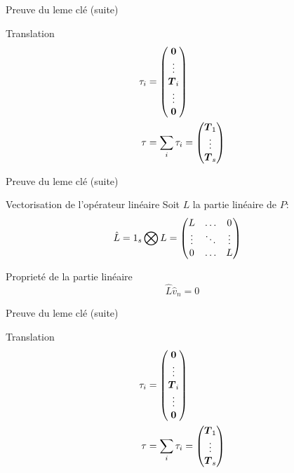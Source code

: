 \begin{frame}{Preuve du leme clé (suite)}
\begin{block}{Translation}
 \begin{align*}
	\tau_i&=\begin{pmatrix}
			{\boldsymbol {0}}\\
			\vdots\\
			{\boldsymbol {T}}_{i}\\
			\vdots\\
			{\boldsymbol {0}}\\
	\end{pmatrix}
	\\
	\tau&=\sum_{i}\tau_{i}=\begin{pmatrix}
			{\boldsymbol {T}}_{1}\\
			\vdots\\
			{\boldsymbol {T}}_{s}\\
	\end{pmatrix}
\end{align*}
\end{block}
\end{frame}

\begin{frame}{Preuve du leme clé (suite)}
 \begin{block}{Vectorisation de l'opérateur linéaire}
 Soit $L$ la partie linéaire de $P$:
\begin{align*}
\hat{L}&=1_{s}\bigotimes L=\begin{pmatrix}L	&\ldots	&0\\
			\vdots &\ddots 	&\vdots\\
			0	&\ldots	&L\\
	\end{pmatrix}
\end{align*}
\end{block}
\begin{block}{Proprieté de la partie linéaire}
\begin{equation*}
\hat{L}\hat{v}_{n}=0
\end{equation*}
 \end{block}

\end{frame}


\begin{frame}{Preuve du leme clé (suite)}
\begin{block}{Translation}
 \begin{align*}
	\tau_i&=\begin{pmatrix}
			{\boldsymbol {0}}\\
			\vdots\\
			{\boldsymbol {T}}_{i}\\
			\vdots\\
			{\boldsymbol {0}}\\
	\end{pmatrix}
	\\
	\tau&=\sum_{i}\tau_{i}=\begin{pmatrix}
			{\boldsymbol {T}}_{1}\\
			\vdots\\
			{\boldsymbol {T}}_{s}\\
	\end{pmatrix}
\end{align*}
\end{block}
\end{frame}

